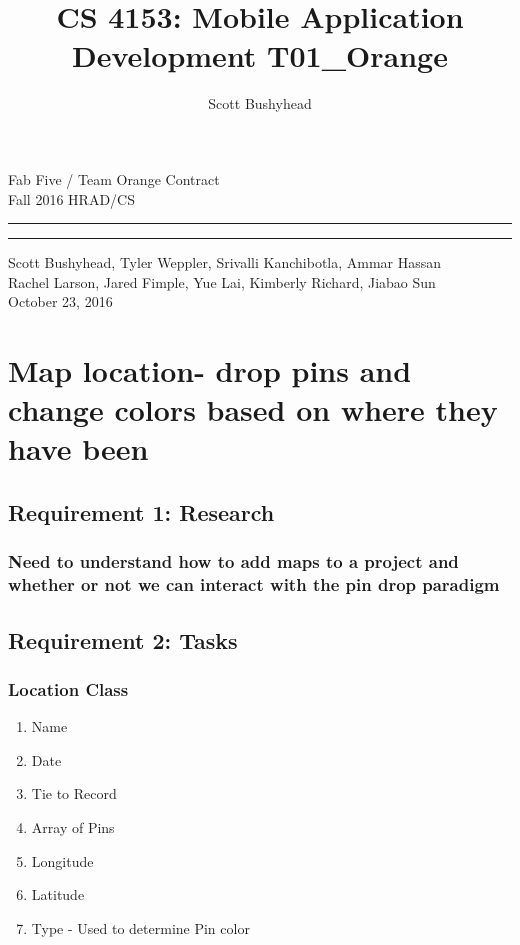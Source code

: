 \documentclass [10pt] {article}
\title{CS 4153: Mobile Application Development \newline
T01_Orange}
\author{Scott Bushyhead}
\begin{document}
\begin{flushright}
{\huge  Fab Five / Team Orange Contract}\\[5pt]
{\huge  Fall 2016 HRAD/CS}\\[15pt]
\vspace{4pt}
\hrule
\vspace{4pt}
\hrule
{\large  Scott Bushyhead, Tyler Weppler, Srivalli Kanchibotla, Ammar Hassan}\\[5pt]
{\large  Rachel Larson, Jared Fimple, Yue Lai, Kimberly Richard, Jiabao Sun}\\[5pt]
{\large October 23, 2016}\\[5pt]
\end{flushright}

\newpage


\section{Map location- drop pins and change colors based on where they have been}
\subsection{Requirement 1: Research}
\subsubsection{Need to understand how to add maps to a project and whether or not we can interact with the pin drop paradigm}
\subsection{Requirement 2: Tasks}
\subsubsection{Location Class}
\begin{enumerate}
\item Name
\item Date
\item Tie to Record
\item Array of Pins
\item Longitude
\item Latitude
\item Type - Used to determine Pin color
\end{enumerate}
\end{document}
